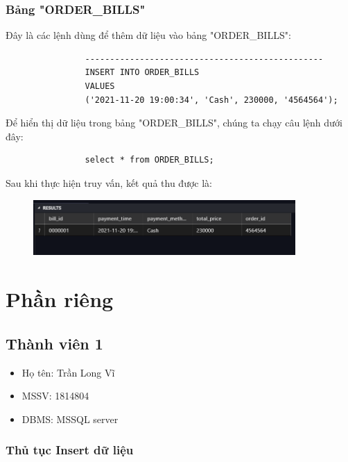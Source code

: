 \documentclass[13pt,a4paper]{article}
\begin{document}
			\subsubsection{Bảng "ORDER\_BILLS"}
			Đây là các lệnh dùng để thêm dữ liệu vào bảng "ORDER\_BILLS":
			\begin{lstlisting}						
				------------------------------------------------
				INSERT INTO ORDER_BILLS
				VALUES
				('2021-11-20 19:00:34', 'Cash', 230000, '4564564');
			\end{lstlisting}
			Để hiển thị dữ liệu trong bảng "ORDER\_BILLS", chúng ta chạy câu lệnh dưới đây:
			\begin{lstlisting}
				select * from ORDER_BILLS;
			\end{lstlisting}
			Sau khi thực hiện truy vấn, kết quả thu được là:
			\begin{figure}[h!]
				\begin{center}
					\includegraphics[width=10cm]{vitran/insert_ob.png}
				\end{center}
			\end{figure}
	\section{Phần riêng}
	\subsection{Thành viên 1}
	\begin{itemize}
		\item Họ tên: Trần Long Vĩ
		\item MSSV: 1814804
		\item DBMS: MSSQL server 
	\end{itemize}
	\subsubsection{Thủ tục Insert dữ liệu}
\end{document}
